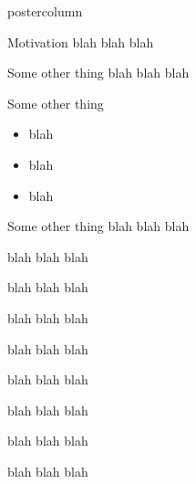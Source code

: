 \documentclass[final]{beamer}
\newlength{\columnheight}
\begin{document}
\begin{frame}
\begin{columns}
    \begin{column}{.33\textwidth}
      \begin{beamercolorbox}[center,wd=\textwidth]{postercolumn}
        \begin{minipage}[T]{.95\textwidth} %
          \parbox[t][\columnheight]{\textwidth}{ %
            
            \begin{block}{Motivation}
              blah blah blah
            \end{block}
            \vfill
            \begin{block}{Some other thing}
              blah blah blah
            \end{block}
            \vfill
            \begin{block}{Some other thing}
              \begin{itemize}
              \item blah
              \item blah
              \item blah
              \end{itemize}              
            \end{block}
            \vfill
            \begin{block}{Some other thing}
              blah blah blah

              blah blah blah

              blah blah blah

              blah blah blah

              blah blah blah

              blah blah blah

              blah blah blah

              blah blah blah

              blah blah blah
            \end{block}
          }
        \end{minipage}
      \end{beamercolorbox}
    \end{column}


  \end{columns}
\end{frame}
\end{document}
